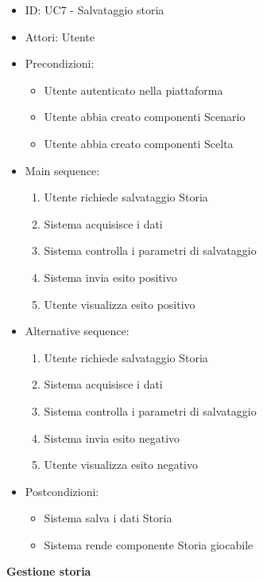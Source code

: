 \documentclass{article}
\begin{document}
\begin{itemize}[label = { }]
    \itemsep0px
    \item ID: UC7 - Salvataggio storia
    \item Attori: Utente
    \item Precondizioni: 
        \begin{itemize}[label = {-}]
            \item Utente autenticato nella piattaforma
            \item Utente abbia creato componenti Scenario
            \item Utente abbia creato componenti Scelta
        \end{itemize}
    \item Main sequence: 
        \begin{enumerate}
            \item Utente richiede salvataggio Storia
            \item Sistema acquisisce i dati
            \item Sistema controlla i parametri di salvataggio
            \item Sistema invia esito positivo
            \item Utente visualizza esito positivo
        \end{enumerate}
    \item Alternative sequence:
        \begin{enumerate}
            \item Utente richiede salvataggio Storia
            \item Sistema acquisisce i dati
            \item Sistema controlla i parametri di salvataggio
            \item Sistema invia esito negativo
            \item Utente visualizza esito negativo
        \end{enumerate}
    \item Postcondizioni: 
        \begin{itemize}[label = {-}]
            \item Sistema salva i dati Storia
            \item Sistema rende componente Storia giocabile
        \end{itemize}
\end{itemize}
\textbf{Gestione storia}
\end{document}
